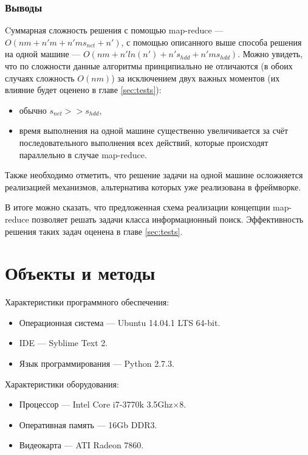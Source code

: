 \documentclass[12pt,a4paper,oneside]{extarticle}
\begin{document}
        \subsubsection{Выводы}
            Cуммарная сложность решения с помощью map-reduce --- $O(nm+n'm+n'ms_{net}+n')$, с помощью описанного выше способа решения на одной машине --- $O(nm+n'ln(n')+n's_{hdd}+n'ms_{hdd})$. Можно увидеть, что по сложности данные алгоритмы принципиально не отличаются (в обоих случаях сложность $O(nm)$) за исключением двух важных моментов (их влияние будет оценено в главе \ref{sec:tests}):
            \begin{itemize}
                \item обычно $s_{net}>>s_{hdd}$,
                \item время выполнения на одной машине существенно увеличивается за счёт последовательного выполнения всех действий, которые происходят параллельно в случае map-reduce.
            \end{itemize}

            Также необходимо отметить, что решение задачи на одной машине осложняется реализацией механизмов, альтернатива которых уже реализована в фреймворке. 

            В итоге можно сказать, что предложенная схема реализации концепции map-reduce позволяет решать задачи класса информационный поиск. Эффективность решения таких задач оценена в главе \ref{sec:tests}.
        
    \clearpage
\clearpage

\section{Объекты и методы}      
        \noindent Характеристики программного обеспечения:
        \begin{itemize}
            \item Операционная система --- Ubuntu 14.04.1 LTS 64-bit.
            \item IDE --- Syblime Text 2.
            \item Язык программирования --- Python 2.7.3.
        \end{itemize}
        
        \noindent Характеристики оборудования:
        \begin{itemize}
            \item Процессор --- Intel Core i7-3770k 3.5Ghz$\times$8.
            \item Оперативная память --- 16Gb DDR3.
            \item Видеокарта --- ATI Radeon 7860.
        \end{itemize}
\clearpage
\end{document}
